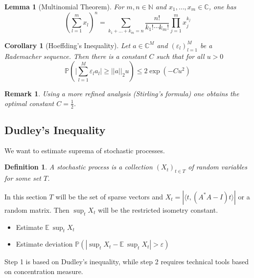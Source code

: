 \documentclass[10pt,a4paper]{article}
\theoremstyle{thmstyle}
\newtheorem{definition}{Definition}
\newtheorem{lemma}{Lemma}
\newtheorem{remark}{Remark}
\newtheorem{corollary}{Corollary}
\newcommand{\E}{\mathbb{E}~}
\renewcommand{\Pr}[1]{\mathbb{P}\left( #1 \right)}
\begin{document}
\begin{lemma}[Multinomial Theorem]
  For $m, n \in \mathbb{N}$ and $x_{1}, \dots, x_{m} \in \mathbb{C}$, one has
  \begin{equation*}
    \left( \sum_{l = 1}^{m} x_{l} \right)^{n} = \sum_{k_{1} + \dots + k_{m} = n} \frac{n!}{k_{1}! \cdots k_{m}!} \prod_{j = 1}^{m} x_{j}^{k_{j}}
  \end{equation*}
\end{lemma}

\begin{corollary}[Hoeffding's Inequality]
  \label{corollary:hoeffding}
  Let $a \in \mathbb{C}^{M}$ and $(\varepsilon_{l})_{l = 1}^{M}$ be a Rademacher sequence.
  Then there is a constant $C$ such that for all $u > 0$
  \begin{equation*}
    \Pr{\Big| \sum_{l = 1}^{M} \varepsilon_{l} a_{l} \Big| \ge ||a||_{2} u} \le 2 \exp(-C u^{2})
  \end{equation*}
\end{corollary}

\begin{remark}
  Using a more refined analysis (Stirling's formula) one obtains the optimal constant $C = \frac{1}{2}$.
\end{remark}

\subsection{Dudley's Inequality}

We want to estimate suprema of stochastic processes.

\begin{definition}
  A \emph{stochastic process} is a collection $(X_{t})_{t \in T}$ of random variables for some set $T$.
\end{definition}

In this section $T$ will be the set of sparse vectors and $X_{t} = |\langle t, (A^{*}A - I)t \rangle|$ or a random matrix.
Then $\sup_{t} X_{t}$ will be the restricted isometry constant.

\begin{itemize}
\item Estimate $\E \sup_{t} X_{t}$
\item Estimate deviation $\Pr{|\sup_{t} X_{t} - \E \sup_{t} X_{t}| > \varepsilon}$
\end{itemize}

Step 1 is based on Dudley's inequality, while step 2 requires technical tools based on concentration measure.
\end{document}
